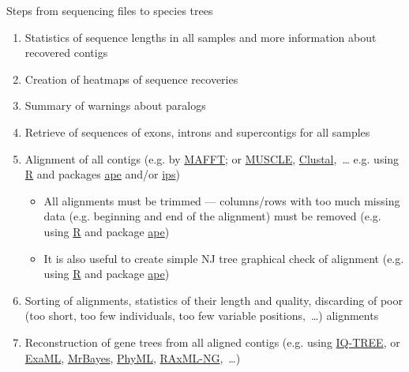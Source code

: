 \documentclass[compress,  xelatex, 11pt, xcolor=x11names, aspectratio=169,
	hyperref={
		bookmarks=true,
		unicode=true,
		colorlinks=true,
		pdftitle={HybSeq course},
		plainpages=false,
		pdfauthor={Vojtech Zeisek},
		pdfsubject={Practical processing of HybSeq target enrichment sequencing data on computing grids like MetaCentrum},
		pdfcreator={XeLaTeX},
		pdfkeywords={BASH, command line, GNU, HybSeq, Linux, MetaCentrum, sequencing shell, target enrichment},
		linkcolor=Turquoise4, %
		anchorcolor=DodgerBlue4, %
		citecolor=DodgerBlue4, %
		filecolor=DodgerBlue4, %
		menucolor=Tan4, %
		urlcolor=DarkOliveGreen4 %
		},
	url={hyphens, lowtilde} %
	]{beamer}
\begin{document}
\begin{frame}[allowframebreaks]{Steps from sequencing files to species trees}
\begin{enumerate}
\begin{enumerate}
\begin{itemize}
				\item All contigs that pass the previous steps are concatenated into a \enquote{supercontig} and the exonerate search is repeated
			\end{itemize}
			\item Search for paralogs --- if SPAdes assembler generates multiple contigs that contain coding sequences representing 75\% of the length of the reference protein, HybPiper will print a warning for that gene
			\item Recovering of the individual sequences
			\item Statistics of the recovery
			\item Cleanup of temporal files (especially SPAdes produces huge amount of data unneeded for further processing)
		\end{enumerate}
		\item Statistics of sequence lengths in all samples and more information about recovered contigs
		\item Creation of heatmaps of sequence recoveries
		\item Summary of warnings about paralogs
		\item Retrieve of sequences of exons, introns and supercontigs for all samples
		\item Alignment of all contigs (e.g. by \href{https://mafft.cbrc.jp/alignment/software/}{MAFFT}; or \href{https://www.drive5.com/muscle/}{MUSCLE}, \href{http://www.clustal.org/}{Clustal},~\ldots{ }e.g. using \href{https://www.r-project.org/}{R} and packages \href{https://cran.r-project.org/package=ape}{ape} and/or \href{https://cran.r-project.org/package=ips}{ips})
		\begin{itemize}
			\item All alignments must be trimmed --- columns/rows with too much missing data (e.g. beginning and end of the alignment) must be removed (e.g. using \href{https://www.r-project.org/}{R} and package \href{https://cran.r-project.org/package=ape}{ape})
			\item It is also useful to create simple NJ tree graphical check of alignment (e.g. using \href{https://www.r-project.org/}{R} and package \href{https://cran.r-project.org/package=ape}{ape})
		\end{itemize}
		\item Sorting of alignments, statistics of their length and quality, discarding of poor (too short, too few individuals, too few variable positions,~\ldots) alignments
		\item Reconstruction of gene trees from all aligned contigs (e.g. using \href{http://www.iqtree.org/}{IQ-TREE}, or \href{https://github.com/stamatak/ExaML}{ExaML}, \href{https://nbisweden.github.io/MrBayes/}{MrBayes}, \href{https://github.com/stephaneguindon/phyml}{PhyML}, \href{https://github.com/amkozlov/raxml-ng}{RAxML-NG},~\ldots)

\end{enumerate}
\end{frame}
\end{document}
